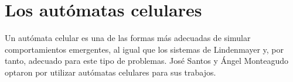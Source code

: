 \section{Los autómatas celulares}

Un autómata celular es una de las formas más adecuadas de simular comportamientos emergentes,
al igual que los sistemas de Lindenmayer y, por tanto, adecuado para este tipo de problemas.
José Santos y Ángel Monteagudo optaron por utilizar autómatas celulares para sus trabajos.
